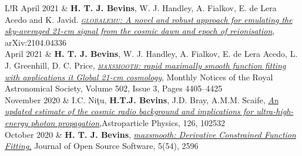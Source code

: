 \documentclass[12pt]{article}
\begin{document}
	\begin{tabular}{L!{\vrule}R}
		April 2021 & \textbf{H. T. J. Bevins}, W. J. Handley, A. Fialkov, E. de Lera Acedo and K. Javid. \href{https://arxiv.org/abs/2104.04336}{\textit{\textsc{globalemu}: A novel and robust approach for emulating the sky-averaged 21-cm signal from the cosmic dawn and epoch of reionisation}}, arXiv:2104.04336 \\
		April 2021 & \textbf{H. T. J. Bevins}, W. J. Handley, A. Fialkov, E. de Lera Acedo, L. J. Greenhill, D. C. Price, \href{https://academic.oup.com/mnras/article/502/3/4405/6105349?guestAccessKey=769d7461-cc0b-4d83-9cdf-bc351056d911}{\textit{\textsc{maxsmooth}: rapid maximally smooth function fitting with applications it Global 21-cm cosmology}}, Monthly Notices of the Royal Astronomical Society, Volume 502, Issue 3, Pages 4405–4425\\
		November 2020 & I.C. Ni\c{t}u, \textbf{H.T.J. Bevins}, J.D. Bray, A.M.M. Scaife, \href{https://www.sciencedirect.com/science/article/pii/S0927650520301043?via\%3Dihub}{\textit{An updated estimate of the cosmic radio background and implications for ultra-high-energy photon propagation}},Astroparticle Physics, 126, 102532 \\
		October 2020 & \textbf{H. T. J. Bevins}, \href{https://joss.theoj.org/papers/10.21105/joss.02596}{\textit{maxsmooth: Derivative Constrained Function Fitting.}} Journal of Open Source Software, 5(54), 2596 \\
	\end{tabular}
\end{document}
